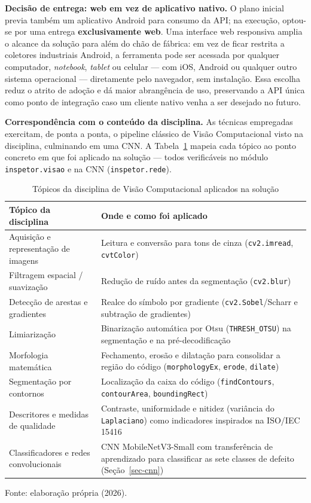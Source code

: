 \documentclass[
	article,			%
	11pt,				%
	oneside,			%
	a4paper,			%
	english,			%
	brazilian,			%
	sumario=tradicional
	]{abntex2}
\begin{document}
\noindent\textbf{Decisão de entrega: web em vez de aplicativo nativo.} O plano
inicial previa também um aplicativo Android para consumo da API; na execução,
optou-se por uma entrega \textbf{exclusivamente web}. Uma interface web responsiva
amplia o alcance da solução para além do chão de fábrica: em vez de ficar restrita
a coletores industriais Android, a ferramenta pode ser acessada por qualquer
computador, \textit{notebook}, \textit{tablet} ou celular --- com iOS, Android ou
qualquer outro sistema operacional --- diretamente pelo navegador, sem instalação.
Essa escolha reduz o atrito de adoção e dá maior abrangência de uso, preservando a
API única como ponto de integração caso um cliente nativo venha a ser desejado no
futuro.

\noindent\textbf{Correspondência com o conteúdo da disciplina.} As técnicas
empregadas exercitam, de ponta a ponta, o pipeline clássico de Visão Computacional
visto na disciplina, culminando em uma CNN. A Tabela~\ref{tab-disciplina} mapeia
cada tópico ao ponto concreto em que foi aplicado na solução --- todos verificáveis
no módulo \texttt{inspetor.visao} e na CNN (\texttt{inspetor.rede}).

\begin{table}[htb]
\centering
\caption{Tópicos da disciplina de Visão Computacional aplicados na solução}
\label{tab-disciplina}
\begin{tabular}{@{}p{5.0cm}p{8.0cm}@{}}
\toprule
\textbf{Tópico da disciplina} & \textbf{Onde e como foi aplicado}\\
\midrule
Aquisição e representação de imagens & Leitura e conversão para tons de cinza
(\texttt{cv2.imread}, \texttt{cvtColor})\\
Filtragem espacial / suavização & Redução de ruído antes da segmentação
(\texttt{cv2.blur})\\
Detecção de arestas e gradientes & Realce do símbolo por gradiente
(\texttt{cv2.Sobel}/Scharr e subtração de gradientes)\\
Limiarização & Binarização automática por Otsu (\texttt{THRESH\_OTSU}) na segmentação
e na pré-decodificação\\
Morfologia matemática & Fechamento, erosão e dilatação para consolidar a região do
código (\texttt{morphologyEx}, \texttt{erode}, \texttt{dilate})\\
Segmentação por contornos & Localização da caixa do código (\texttt{findContours},
\texttt{contourArea}, \texttt{boundingRect})\\
Descritores e medidas de qualidade & Contraste, uniformidade e nitidez (variância do
\texttt{Laplaciano}) como indicadores inspirados na ISO/IEC 15416\\
Classificadores e redes convolucionais & CNN MobileNetV3-Small com transferência de
aprendizado para classificar as sete classes de defeito (Seção~\ref{sec-cnn})\\
\bottomrule
\end{tabular}

\vspace{2pt}
{\footnotesize Fonte: elaboração própria (2026).}
\end{table}
\end{document}

